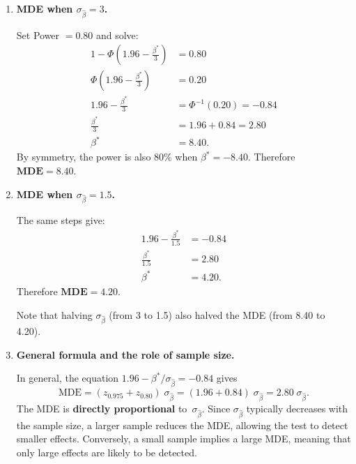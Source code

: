 \documentclass[12pt]{article}
\begin{document}
\begin{enumerate}
\begin{enumerate}
\item \textbf{MDE when $\sigma_{\hat{\beta}} = 3$.}

Set Power $= 0.80$ and solve:
\begin{align*}
1 - \Phi\!\left(1.96 - \frac{\beta^*}{3}\right) &= 0.80 \\[4pt]
\Phi\!\left(1.96 - \frac{\beta^*}{3}\right) &= 0.20 \\[4pt]
1.96 - \frac{\beta^*}{3} &= \Phi^{-1}(0.20) = -0.84 \\[4pt]
\frac{\beta^*}{3} &= 1.96 + 0.84 = 2.80 \\[4pt]
\beta^* &= 8.40.
\end{align*}
By symmetry, the power is also 80\% when $\beta^* = -8.40$. Therefore $\mathbf{MDE = 8.40}$.

\bigskip

\item \textbf{MDE when $\sigma_{\hat{\beta}} = 1.5$.}

The same steps give:
\begin{align*}
1.96 - \frac{\beta^*}{1.5} &= -0.84 \\[4pt]
\frac{\beta^*}{1.5} &= 2.80 \\[4pt]
\beta^* &= 4.20.
\end{align*}
Therefore $\mathbf{MDE = 4.20}$.

Note that halving $\sigma_{\hat{\beta}}$ (from 3 to 1.5) also halved the MDE (from 8.40 to 4.20).

\bigskip

\item \textbf{General formula and the role of sample size.}

In general, the equation $1.96 - \beta^*/\sigma_{\hat{\beta}} = -0.84$ gives
$$
\text{MDE} = (z_{0.975} + z_{0.80})\;\sigma_{\hat{\beta}} = (1.96 + 0.84)\;\sigma_{\hat{\beta}} = 2.80\;\sigma_{\hat{\beta}}.
$$
The MDE is \textbf{directly proportional} to~$\sigma_{\hat{\beta}}$. Since $\sigma_{\hat{\beta}}$ typically decreases with the sample size, a larger sample reduces the MDE, allowing the test to detect smaller effects. Conversely, a small sample implies a large MDE, meaning that only large effects are likely to be detected.

\end{enumerate}

\bigskip



\end{enumerate}
\end{document}
